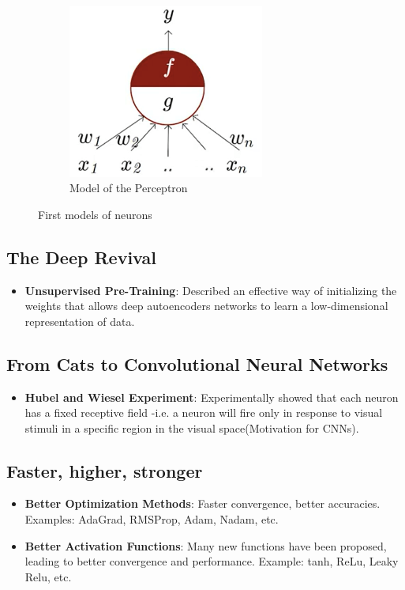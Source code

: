 \documentclass[a4paper]{article}
\begin{document}
\begin{itemize}
\begin{figure}[H]
\begin{subfigure}[b]{0.45\textwidth}
            \centering
            \includegraphics[width=0.71\textwidth]{Degree/static/DL_perceptron.png}
            \caption{Model of the Perceptron}
            \label{fig:DL-perceptron}
        \end{subfigure}
        \caption{First models of neurons}
        \label{fig:DL-first-neurons}
    \end{figure}
\end{itemize}

\subsection{The Deep Revival}
\begin{itemize}
    \item \textbf{Unsupervised Pre-Training}: Described an effective way of initializing the weights that allows deep autoencoders networks to learn a low-dimensional representation of data.
\end{itemize}

\subsection{From Cats to Convolutional Neural Networks}
\begin{itemize}
    \item \textbf{Hubel and Wiesel Experiment}: Experimentally showed that each neuron has a fixed receptive field -i.e. a neuron will fire only in response to visual stimuli in a  specific region in the visual space(Motivation for CNNs).
\end{itemize}

\subsection{Faster, higher, stronger}
\begin{itemize}
    \item \textbf{Better Optimization Methods}: Faster convergence, better accuracies. Examples: AdaGrad, RMSProp, Adam, Nadam, etc.
    \item \textbf{Better Activation Functions}: Many new functions have been proposed, leading to better convergence and performance. Example: tanh, ReLu, Leaky Relu, etc.
\end{itemize}
\end{document}
